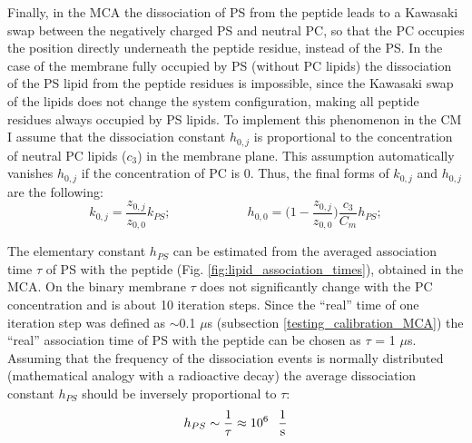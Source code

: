 Finally, in the MCA the dissociation of PS from the peptide leads to a Kawasaki swap between the negatively charged PS and neutral PC, so that the PC occupies the position directly underneath the peptide residue, instead of the PS. In the case of the membrane fully occupied by PS (without PC lipids) the dissociation of the PS lipid from the peptide residues is impossible, since the Kawasaki swap of the lipids does not change the system configuration, making all peptide residues always occupied by PS lipids. To implement this phenomenon in the CM I assume that the dissociation constant $h_{0,j}$ is proportional to the concentration of neutral PC lipids ($c_3$) in the membrane plane. This assumption automatically vanishes $h_{0,j}$ if the concentration of PC is 0. Thus, the final forms of $k_{0,j}$ and $h_{0,j}$ are the following:
\begin{equation}
\label{electro_reaction_constants}
 k_{0,j} = \frac{z_{0,j}}{z_{0,0}}k_{PS}; \hspace{1in} h_{0,0} = \Big(1 - \frac{z_{0,j}}{z_{0,0}}\Big)\frac{c_3}{C_m}h_{PS}; 
\end{equation}

The elementary constant $h_{PS}$ can be estimated from the averaged association time $\tau$ of PS with the peptide (Fig. \ref{fig:lipid_association_times}), obtained in the MCA. On the binary membrane $\tau$ does not significantly change with the PC concentration and is about 10 iteration steps. Since the ``real'' time of one iteration step was defined as $\sim$0.1 $\mu$s (subsection \ref{testing_calibration_MCA}) the ``real'' association time of PS with the peptide can be chosen as $\tau$ = 1 $\mu$s. Assuming that the frequency of the dissociation events is normally distributed (mathematical analogy with a radioactive decay) the average dissociation constant $h_{PS}$ should be inversely proportional to $\tau$:
\begin{equation}
\label{elementary_dissociation}
 h_{PS}\sim\frac{1}{\tau}\approx 10^6 \hspace{0.1in} \frac{1}{\text{s}}
\end{equation}

